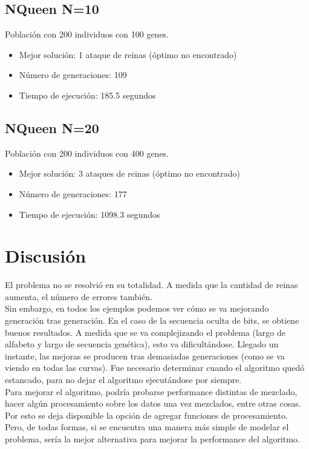 \documentclass[letterpaper,11pt]{article} %
\begin{document}

\subsection{NQueen N=10}
Población con 200 individuos con 100 genes.

\begin{itemize}
\item Mejor solución: 1 ataque de reinas (óptimo no encontrado)
\item Número de generaciones: 109
\item Tiempo de ejecución: 185.5 segundos
\end{itemize}


\subsection{NQueen N=20}
Población con 200 individuos con 400 genes.

\begin{itemize}
\item Mejor solución: 3 ataques de reinas (óptimo no encontrado)
\item Número de generaciones: 177
\item Tiempo de ejecución: 1098.3 segundos
\end{itemize}


\section{Discusión}

El problema no se resolvió en su totalidad. A medida que la cantidad de reinas aumenta, el número de errores también.\\

Sin embargo, en todos los ejemplos podemos ver cómo se va mejorando generación tras generación. En el caso de la secuencia oculta de bits, se obtiene buenos resultados. A medida que se va complejizando el problema (largo de alfabeto y largo de secuencia genética), esto va dificultándose. Llegado un instante, las mejoras se producen tras demasiadas generaciones (como se va viendo en todas las curvas). Fue necesario determinar cuando el algoritmo quedó estancado, para no dejar el algoritmo ejecutándose por siempre.\\

Para mejorar el algoritmo, podría probarse performance distintas de mezclado, hacer algún procesamiento sobre los datos una vez mezclados, entre otras cosas. Por esto se deja disponible la opción de agregar funciones de procesamiento. Pero, de todas formas, si se encuentra una manera más simple de modelar el problema, sería la mejor alternativa para mejorar la performance del algoritmo.

\end{document}
